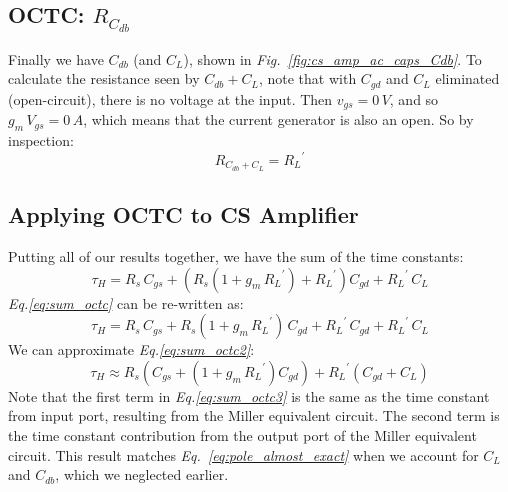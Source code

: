 \subsection{OCTC: \texorpdfstring{$R_{C_{db}}$}{Equivalent Drain-Body Capacitor Resistance}}
Finally we have $C_{db}$ (and $C_L$), shown in \emph{Fig.~\ref{fig:cs_amp_ac_caps_Cdb}}. To calculate the resistance seen by $C_{db} + C_L$, note that with $C_{gd}$ and $C_L$ eliminated (open-circuit), there is no voltage at the input.  Then $v_{gs} = 0\,V$, and so $g_m\,V_{gs} = 0\,A$, which means that the current generator is also an open.  So by inspection:
    \begin{equation}
        \boxed{R_{C_{db} + C_L} = {R_L}^{'}}
    \end{equation}
\subsection{Applying OCTC to CS Amplifier}
Putting all of our results together, we have the sum of the time constants:
    \begin{equation} 
        \tau_H = R_s\,C_{gs} + \left(R_s(1 + g_m\,{R_L}^{'}) + {R_L}^{'} \right)C_{gd} + {R_L}^{'}\,C_L
        \label{eq:sum_octc}
    \end{equation}
\emph{Eq.\ref{eq:sum_octc}} can be re-written as:
    \begin{equation} 
        \tau_H = R_s\,C_{gs} + R_s(1 + g_m\,{R_L}^{'})\,C_{gd} + {R_L}^{'}\,C_{gd} + {R_L}^{'}\,C_L
        \label{eq:sum_octc2}
    \end{equation}
We can approximate \emph{Eq.\ref{eq:sum_octc2}}:
    \begin{equation} 
        \boxed{\tau_H \approx R_s\left(C_{gs} + (1 + g_m\,{R_L}^{'})C_{gd}\right) + {R_L}^{'}\left(C_{gd} + C_L\right)}
        \label{eq:sum_octc3}
    \end{equation}
Note that the first term in \emph{Eq.\ref{eq:sum_octc3}} is the same as the time constant from input port, resulting from the Miller equivalent circuit.  The second term is the time constant contribution from the output port of the Miller equivalent circuit.  This result matches \emph{Eq.~\ref{eq:pole_almost_exact}} when we account for $C_L$ and $C_{db}$, which we neglected earlier.
